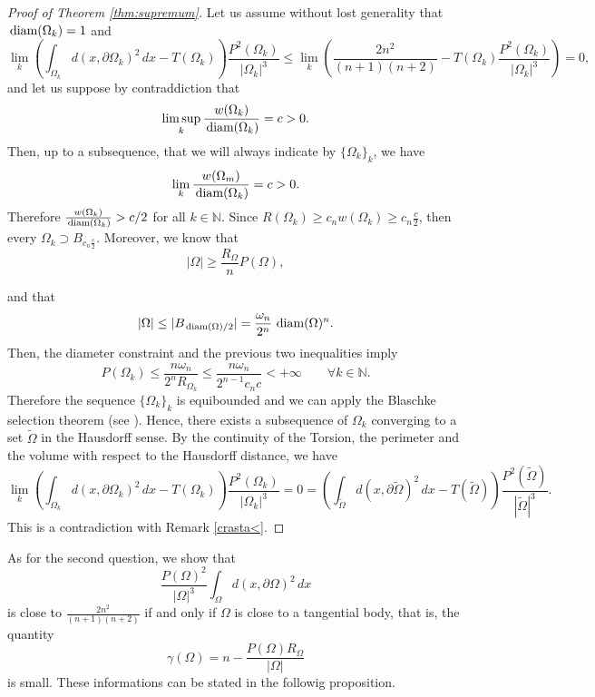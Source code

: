 \documentclass[oneside,a4paper,11pt,notitlepage]{article}
\newcommand{\abs}[1]{{\left|#1\right|}}
\theoremstyle{definition}
\theoremstyle{plain}
\theoremstyle{definition}
\DeclareMathOperator{\diam}{\, \textup{diam}}
\begin{document}
\begin{proof}[Proof
    of Theorem \ref{thm:supremum}]Let us assume without lost generality that $\diam (\Omega_k)=1$ and 
    $$ \lim_k \left(\int_{\Omega_k}d(x,\partial \Omega_k)^2 \,dx- T(\Omega_k)\right)\frac{P^2(\Omega_k)}{\abs{\Omega_k}^3} \leq \lim_k \left(\frac{2n^2}{(n+1)(n+2)} - T(\Omega_k)\frac{P^2(\Omega_k)}{\abs{\Omega_k}^3}\right)=0 ,$$
        and let us suppose by contraddiction that $$\limsup_k \frac{w(\Omega_k)}{\diam(\Omega_k)} = c >0.$$ 
        Then, up to a subsequence, that we will always indicate by $\{\Omega_k\}_k$, we have
    $$\lim_k \frac{w(\Omega_m)}{\diam(\Omega_k)} = c >0.$$
    Therefore $\frac{w(\Omega_k)}{\diam(\Omega_k)} > c/2$ for all $k \in \mathbb N$. Since $R(\Omega_k) \geq c_n w(\Omega_k) \geq c_n \frac{c}{2}$, then every
     $\Omega_k \supset B_{c_n \frac{c}{2}}$. Moreover, we know that
     \begin{equation*}
         \abs{\Omega} \ge \frac{R_{\Omega}}{n}P(\Omega),
     \end{equation*}
     
     and that \begin{equation*}
         \abs{\Omega}\le |B_{\diam(\Omega)/2}|= \frac{\omega_n}{2^n}\diam(\Omega)^n.
     \end{equation*}
     Then, the diameter constraint and the previous two inequalities imply
     \begin{equation*}
        P(\Omega_k) \le \frac{n\omega_n}{2^nR_{\Omega_k}}\le \frac{n\omega_n}{2^{n-1}c_nc}<+\infty \qquad \forall k\in \mathbb N.
     \end{equation*}
    Therefore the sequence $\{\Omega_k\}_k$ is equibounded and we can apply the Blaschke selection theorem (see    \cite[theorem 1.8.6]{schneider}). Hence, there exists a subsequence of $\Omega_k$ converging to a set $\tilde \Omega$ in the Hausdorff sense.
By the continuity of the Torsion, the perimeter and the volume with respect to the Hausdorff distance, we have  
    $$ \lim_k \left(\int_{\Omega_k}d(x,\partial \Omega_k)^2 \, dx - T(\Omega_k)\right)\frac{P^2(\Omega_k)}{\abs{\Omega_k}^3}= 0= \left(\int_{\tilde\Omega}d(x,\partial \tilde \Omega)^2 \, dx - T(\tilde \Omega)\right)\frac{P^2(\tilde \Omega)}{\abs{\tilde \Omega}^3}.$$
This is a contradiction with Remark \ref{crasta<}.


    \end{proof}
 

As for the second question, we show that 
\[
\frac{ P(\Omega)^2}{\abs{\Omega}^3}\int_{\Omega}d(x,\partial\Omega)^2\, dx
\]
is close to $\frac{2n^2}{(n+1)(n+2)}$ if and only if $\Omega$ is close to a tangential body, that is, the quantity
\[
\gamma(\Omega) =  n-\frac{P(\Omega)R_\Omega}{\abs{\Omega}}
\]
is small. These informations can be stated in the followig proposition.
\end{document}
